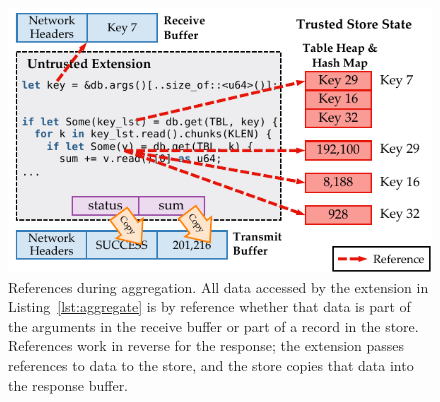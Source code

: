 \begin{figure}[t]
  \includegraphics[width=1.0\columnwidth]{figures/tao-extension.pdf}
  \caption{References during aggregation. All data accessed by the extension in
  Listing~\ref{lst:aggregate} is by reference whether that data is part of the
  arguments in the receive buffer or part of a record in the store. References
  work in reverse for the response; the extension passes references to data to
  the store, and the store copies that data into the response buffer.}
  \label{fig:tao}
\end{figure}
